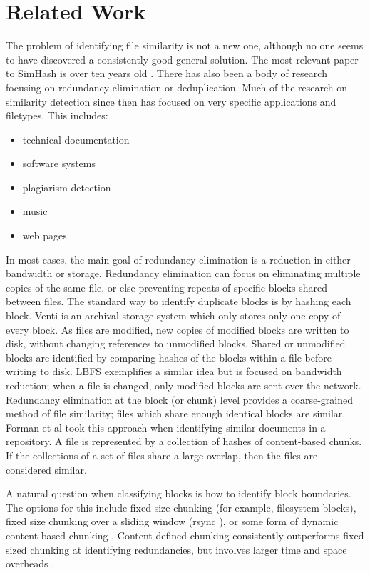 \documentclass[10pt, twocolumn]{article}
\begin{document}
\section{Related Work}

The problem of identifying file similarity is not a new one, although no one seems to have discovered a consistently good general solution. The most relevant paper to SimHash is over ten years old \cite{manber}. There has also been a body of research focusing on redundancy elimination or deduplication. Much of the research on similarity detection since then has focused on very specific applications and filetypes. This includes:
\begin{itemize}
\item technical documentation \cite{hpDocRepositories} 
\item software systems \cite{sourcecode} 
\item plagiarism detection \cite{hoad} \cite{bernstein}
\item music \cite{music}
\item web pages \cite{buttler}
\end{itemize}

In most cases, the main goal of redundancy elimination is a reduction in either bandwidth or storage. Redundancy elimination  can focus on eliminating multiple copies of the same file, or else preventing repeats of specific blocks shared between files. The standard way to identify duplicate blocks is by hashing each block. Venti \cite{venti} is an archival storage system which only stores only one copy of every block. As files are modified, new copies of modified blocks are written to disk, without changing references to unmodified blocks. Shared or unmodified blocks are identified by comparing hashes of the blocks within a file before writing to disk. LBFS \cite{lbfs} exemplifies a similar idea but is focused on bandwidth reduction; when a file is changed, only modified blocks are sent over the network. Redundancy elimination at the block (or chunk) level provides a coarse-grained method of file similarity; files which share enough identical blocks are similar. Forman et al\cite{hpDocRepositories} took this approach when identifying similar documents in a repository. A file is represented by a collection of hashes of content-based chunks. If the collections of a set of files share a large overlap, then the files are considered similar.

A natural question when classifying blocks is how to identify block boundaries. The options for this include fixed size chunking (for example, filesystem blocks), fixed size chunking over a sliding window (rsync \cite{rsync}), or some form of dynamic content-based chunking \cite{lbfs}. Content-defined chunking consistently outperforms fixed sized chunking at identifying redundancies, but involves larger time and space overheads  \cite{policroniades2004adr}.
\end{document}
